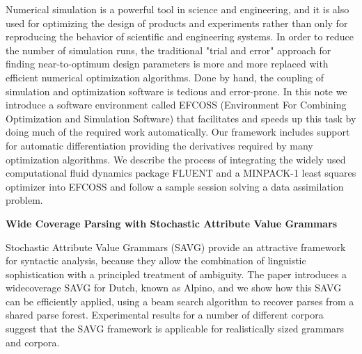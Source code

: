 \documentclass[11pt]{article}
\begin{document}
\noindent
Numerical simulation is a powerful tool in science and engineering,
and it is also used for optimizing the design of products and
experiments rather than only for reproducing the behavior of
scientific and engineering systems. In order to reduce the number of
simulation runs, the traditional "trial and error" approach for
finding near-to-optimum design parameters is more and more replaced
with efficient numerical optimization algorithms. Done by hand, the
coupling of simulation and optimization software is tedious and
error-prone. In this note we introduce a software environment called
EFCOSS (Environment For Combining Optimization and Simulation
Software) that facilitates and speeds up this task by doing much of
the required work automatically. Our framework includes support for
automatic differentiation providing the derivatives required by many
optimization algorithms. We describe the process of integrating the
widely used computational fluid dynamics package FLUENT and a
MINPACK-1 least squares optimizer into EFCOSS and follow a sample
session solving a data assimilation problem.


\bigskip
\noindent
\textbf{Wide Coverage Parsing with Stochastic Attribute Value Grammars}
\cite{malouf2004wide}

\noindent
Stochastic Attribute Value Grammars
(SAVG) provide an attractive framework
for syntactic analysis, because they allow
the combination of linguistic sophistication
with a principled treatment of ambiguity.
The paper introduces a widecoverage
SAVG for Dutch, known as
Alpino, and we show how this SAVG can
be efficiently applied, using a beam search
algorithm to recover parses from a shared
parse forest. Experimental results for a
number of different corpora suggest that
the SAVG framework is applicable for realistically
sized grammars and corpora.






\end{document}
